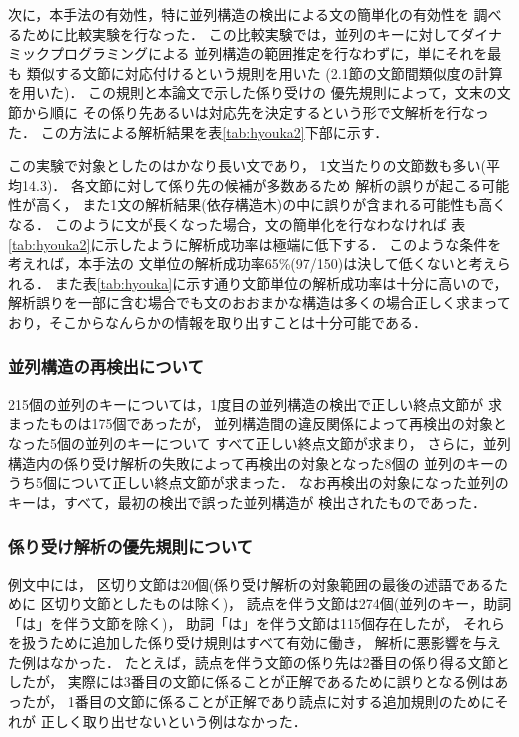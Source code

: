 次に，本手法の有効性，特に並列構造の検出による文の簡単化の有効性を
調べるために比較実験を行なった．
この比較実験では，並列のキーに対してダイナミックプログラミングによる
並列構造の範囲推定を行なわずに，単にそれを最も
類似する文節に対応付けるという規則を用いた
(2.1節の文節間類似度の計算を用いた)．
この規則と本論文で示した係り受けの
優先規則によって，文末の文節から順に
その係り先あるいは対応先を決定するという形で文解析を行なった．
この方法による解析結果を表\ref{tab:hyouka2}下部に示す．

この実験で対象としたのはかなり長い文であり，
1文当たりの文節数も多い(平均14.3)．
各文節に対して係り先の候補が多数あるため
解析の誤りが起こる可能性が高く，
また1文の解析結果(依存構造木)の中に誤りが含まれる可能性も高くなる．
このように文が長くなった場合，文の簡単化を行なわなければ
表\ref{tab:hyouka2}に示したように解析成功率は極端に低下する．
このような条件を考えれば，本手法の
文単位の解析成功率65\%(97/150)は決して低くないと考えられる．
また表\ref{tab:hyouka}に示す通り文節単位の解析成功率は十分に高いので，
解析誤りを一部に含む場合でも文のおおまかな構造は多くの場合正しく求まって
おり，そこからなんらかの情報を取り出すことは十分可能である．

\subsubsection*{並列構造の再検出について}

215個の並列のキーについては，1度目の並列構造の検出で正しい終点文節が
求まったものは175個であったが，
並列構造間の違反関係によって再検出の対象となった5個の並列のキーについて
すべて正しい終点文節が求まり，
さらに，並列構造内の係り受け解析の失敗によって再検出の対象となった8個の
並列のキーのうち5個について正しい終点文節が求まった．
なお再検出の対象になった並列のキーは，すべて，最初の検出で誤った並列構造が
検出されたものであった．

\subsubsection*{係り受け解析の優先規則について}

例文中には，
区切り文節は20個(係り受け解析の対象範囲の最後の述語であるために
区切り文節としたものは除く)，
読点を伴う文節は274個(並列のキー，助詞「は」を伴う文節を除く)，
助詞「は」を伴う文節は115個存在したが，
それらを扱うために追加した係り受け規則はすべて有効に働き，
解析に悪影響を与えた例はなかった．
たとえば，読点を伴う文節の係り先は2番目の係り得る文節としたが，
実際には3番目の文節に係ることが正解であるために誤りとなる例はあったが，
1番目の文節に係ることが正解であり読点に対する追加規則のためにそれが
正しく取り出せないという例はなかった．

